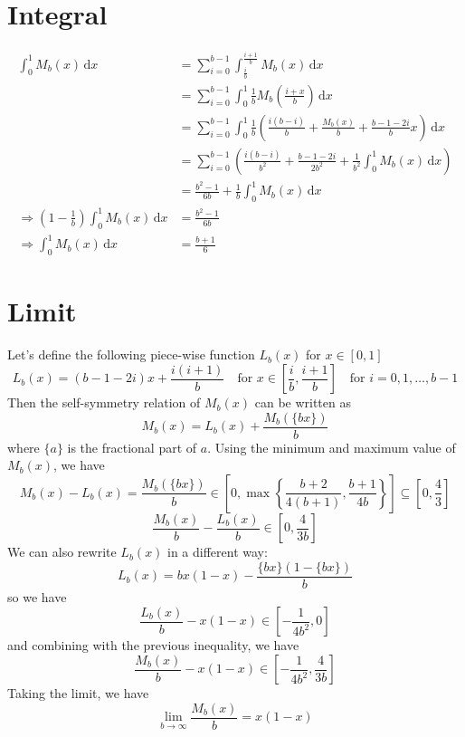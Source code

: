 \documentclass[]{article}
\newcommand{\ud}{\mathrm{d}}
\begin{document}
\section{Integral}
\begin{align*}
\int_0^1 M_b(x)\,\ud x &= \sum_{i=0}^{b-1}\int_{\frac{i}{b}}^{\frac{i+1}{b}} M_b(x)\,\ud x\\
&=\sum_{i=0}^{b-1}\int_{0}^{1} \frac{1}{b}M_b\left(\frac{i+x}{b}\right)\,\ud x\\
&=\sum_{i=0}^{b-1}\int_{0}^{1} \frac{1}{b}\left(\frac{i(b-i)}{b} + \frac{M_b(x)}{b} + \frac{b-1-2i}{b} x\right)\,\ud x\\
&=\sum_{i=0}^{b-1}\left(\frac{i(b-i)}{b^2}  + \frac{b-1-2i}{2b^2} +  \frac{1}{b^2}\int_{0}^{1} M_b(x)\,\ud x\right)\\
&=\frac{b^2-1}{6b} + \frac{1}{b}\int_{0}^{1} M_b(x)\,\ud x\\
\Rightarrow \left(1-\frac{1}{b}\right)\int_0^1 M_b(x)\,\ud x &= \frac{b^2-1}{6b}\\
\Rightarrow \int_0^1 M_b(x)\,\ud x &= \frac{b+1}{6}
\end{align*}





\section{Limit}

Let's define the following piece-wise function $L_b(x)$ for $x\in[0,1]$
\[
L_b(x) = (b-1-2i)x + \frac{i(i+1)}{b}\quad\mbox{for }x\in\left[\frac{i}{b}, \frac{i+1}{b}\right]\quad\mbox{for }i = 0, 1, \dots,b-1
\]
Then the self-symmetry relation of $M_b(x)$ can be written as
\[
M_b(x) = L_b(x) + \frac{M_b(\{bx\})}{b}
\]
where $\{a\}$ is the fractional part of $a$. Using the minimum and maximum value of $M_b(x)$, we have
\[
M_b(x) - L_b(x) = \frac{M_b(\{bx\})}{b} \in \left[0, \max\left\{\frac{b+2}{4(b+1)}, \frac{b+1}{4b}\right\}\right]\subseteq\left[0, \frac{4}{3}\right]
\]
\[
\frac{M_b(x)}{b} - \frac{L_b(x)}{b} \in \left[0, \frac{4}{3b}\right]
\]
We can also rewrite $L_b(x)$ in a different way:
\[
L_b(x) = bx(1-x) - \frac{\{bx\}( 1-\{bx\} ) }{b}
\]
so we have
\[
\frac{L_b(x)}{b}  - x(1-x) \in \left[-\frac{1}{4b^2}, 0\right]
\]
and combining with the previous inequality, we have
\[
\frac{M_b(x)}{b}   - x(1-x)\in \left[-\frac{1}{4b^2}, \frac{4}{3b}\right]
\]
Taking the limit, we have
\[
\lim_{b\to\infty}\frac{M_b(x)}{b} = x(1-x)
\]
\end{document}
